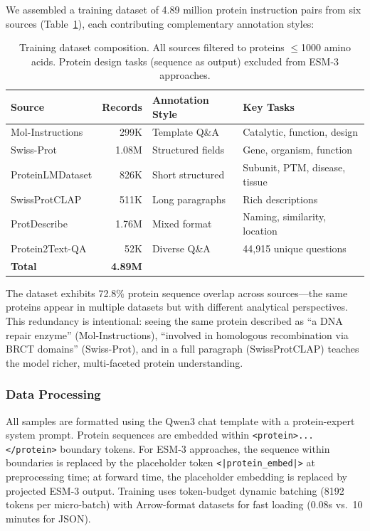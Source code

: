 \documentclass[11pt]{article}
\begin{document}
We assembled a training dataset of 4.89 million protein instruction pairs from six sources (Table~\ref{tab:dataset}), each contributing complementary annotation styles:

\begin{table}[t]
    \centering
    \caption{Training dataset composition. All sources filtered to proteins $\leq$1000 amino acids. Protein design tasks (sequence as output) excluded from ESM-3 approaches.}
    \label{tab:dataset}
    \begin{tabular}{@{}lrll@{}}
        \toprule
        Source & Records & Annotation Style & Key Tasks \\
        \midrule
        Mol-Instructions~\cite{fang2024mol} & 299K & Template Q\&A & Catalytic, function, design \\
        Swiss-Prot & 1.08M & Structured fields & Gene, organism, function \\
        ProteinLMDataset & 826K & Short structured & Subunit, PTM, disease, tissue \\
        SwissProtCLAP & 511K & Long paragraphs & Rich descriptions \\
        ProtDescribe & 1.76M & Mixed format & Naming, similarity, location \\
        Protein2Text-QA & 52K & Diverse Q\&A & 44,915 unique questions \\
        \midrule
        \textbf{Total} & \textbf{4.89M} & & \\
        \bottomrule
    \end{tabular}
\end{table}

The dataset exhibits 72.8\% protein sequence overlap across sources---the same proteins appear in multiple datasets but with different analytical perspectives. This redundancy is intentional: seeing the same protein described as ``a DNA repair enzyme'' (Mol-Instructions), ``involved in homologous recombination via BRCT domains'' (Swiss-Prot), and in a full paragraph (SwissProtCLAP) teaches the model richer, multi-faceted protein understanding.

\subsubsection{Data Processing}

All samples are formatted using the Qwen3 chat template with a protein-expert system prompt. Protein sequences are embedded within \texttt{<protein>...</protein>} boundary tokens. For ESM-3 approaches, the sequence within boundaries is replaced by the placeholder token \texttt{<|protein\_embed|>} at preprocessing time; at forward time, the placeholder embedding is replaced by projected ESM-3 output. Training uses token-budget dynamic batching (8192 tokens per micro-batch) with Arrow-format datasets for fast loading (0.08s vs.\ 10 minutes for JSON).
\end{document}

